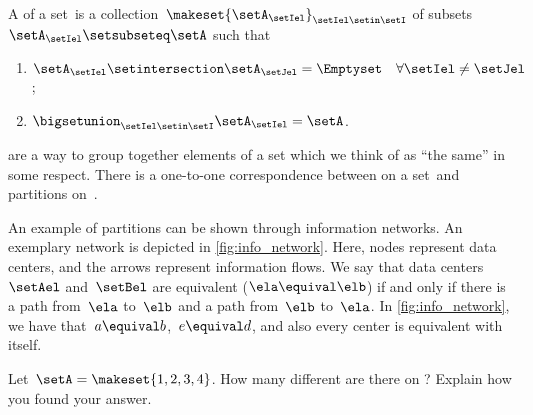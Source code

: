 \begin{ctdefinition}[Partition]
    \label{def:partition}
    A  of a set~\setA is a collection~$\makeset{\setA_\setIel}_{\setIel\setin \setI}$ of subsets~$\setA_\setIel\setsubseteq \setA$ such that
    \begin{enumerate}
        \item $\setA_\setIel\setintersection \setA_\setJel=\Emptyset \quad \forall \setIel\neq \setJel$;
        \item $\bigsetunion_{\setIel\setin \setI}\setA_\setIel=\setA$.
    \end{enumerate}
\end{ctdefinition}

\begin{remark}
     are a way to group together elements of a set which we think of as ``the same'' in some respect.
    There is a one-to-one correspondence between  on a set~\setA and partitions on~\setA.
\end{remark}

\begin{marginfigure}
    \centering
    \caption{
        \label{fig:info_network}
    }
\end{marginfigure}

\begin{example}
    An example of partitions can be shown through information networks.
    An exemplary network is depicted in \cref{fig:info_network}.
    Here, nodes represent data centers, and the arrows represent information flows.
    We say that data centers~$\setAel$ and~$\setBel$ are equivalent ($\ela\equival \elb$) if and only if there is a path from~$\ela$ to~$\elb$ and a path from~$\elb$ to~$\ela$.
    In \cref{fig:info_network}, we have that~$a\equival b$,~$e\equival d$, and also every center is equivalent with itself.
\end{example}

\vfill
\begin{gradedexercise}
    \label{ex:CountingEquivalenceRelations}
    Let~$\setA = \makeset{ 1, 2, 3, 4 }$.
    How many different  are there on \setA?
    Explain how you found your answer.
\end{gradedexercise}


